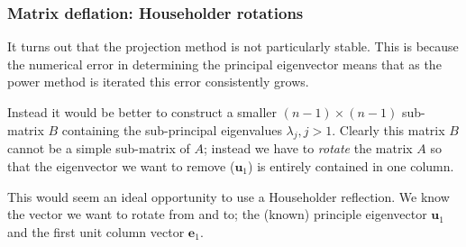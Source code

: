 \documentclass{beamer}
\newcommand{\bfm}[1]{{\boldsymbol{#1}}}
\begin{document}
\begin{frame}
  \frametitle{Matrix deflation: Householder rotations}

  It turns out that the projection method is not particularly
  stable. This is because the numerical error in determining the
  principal eigenvector means that as the power method is iterated
  this error consistently grows. \pause

  Instead it would be better to construct a smaller $(n - 1) \times (n
  - 1)$ sub-matrix $B$ containing the sub-principal eigenvalues
  $\lambda_j, j>1$. \pause Clearly this matrix $B$ cannot be a simple
  sub-matrix of $A$; instead we have to \emph{rotate} the matrix $A$
  so that the eigenvector we want to remove ($\bfm{u}_1$) is entirely
  contained in one column. \pause

  This would seem an ideal opportunity to use a Householder reflection.
  \pause We know the vector we want to rotate from and to; the (known)
  principle eigenvector $\bfm{u}_1$ and the first unit column vector
  $\bfm{e}_1$.

\end{frame}
\end{document}
